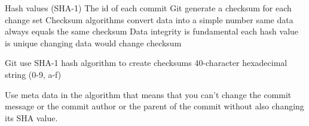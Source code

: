 Hash values (SHA-1)
  The id of each commit 
  Git generate a checksum for each change set
  Checksum algorithms convert data into a simple number 
  same data always equals the same checksum  
  Data integrity is fundamental 
  each hash value is unique 
  changing data would change checksum 

  Git use SHA-1 hash algorithm to create checksums 
  40-character hexadecimal string (0-9, a-f)

  Use meta data in the algorithm
  that means that you can't change the commit message 
  or the commit author or the parent of the commit 
  without also changing its SHA value.